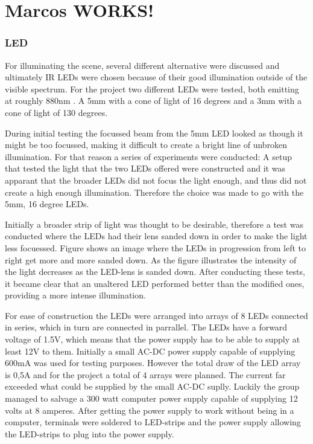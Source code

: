 \chapter{Marcos WORKS!}

\subsection{LED}
For illuminating the scene, several different alternative were discussed and ultimately IR LEDs were chosen  because of their good illumination outside of the visible spectrum. For the project two different LEDs were tested, both emitting at roughly 880nm . A 5mm with a cone of light of 16 degrees and a 3mm with a cone of light of 130 degrees. 

During initial testing the focussed beam from the 5mm LED looked as though it might be too focussed, making it  difficult to create a bright line of unbroken illumination. For that reason a series of experiments were conducted: A setup that tested the light that the two LEDs offered  were constructed and it was apparant that the broader LEDs did not focus the light enough, and thus did not create a high enough illumination. Therefore the choice was made to go with the 5mm, 16 degree LEDs.

Initially a broader strip of light was thought to be desirable, therefore a test was conducted where the LEDs had their lens sanded down in order to make the light less focuessed. Figure  shows an image where the LEDs in progression from left to right get more and more sanded down. As the figure illustrates the intensity of the light decreases as the LED-lens is sanded down. After conducting these tests,  it became clear that an unaltered LED performed better than the modified ones, providing a more intense illumination.

For ease of construction the LEDs were arranged into arrays of 8 LEDs connected in series, which in turn are connected in parrallel. The LEDs have a forward voltage of 1.5V, which means that the power supply has to be able to supply at least 12V to them. Initially a small AC-DC power supply capable of supplying 600mA was used for testing purposes. However the total draw of the LED array is 0,5A and for the project a total of 4 arrays were planned. The current far exceeded what could be supplied by the small AC-DC suplly. Luckily the group managed to salvage a 300 watt computer power supply capable of supplying 12 volts at 8 amperes. After getting the power supply to work without being in a computer, terminals were soldered to LED-strips and the power supply allowing the LED-strips to plug into the power supply.

